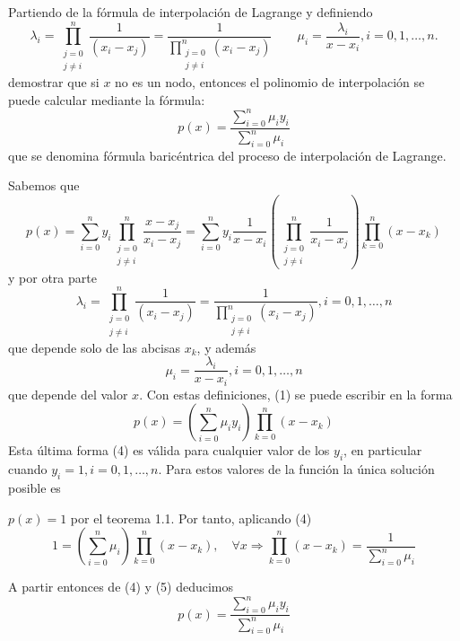 \begin{frame}
	Partiendo de la fórmula de interpolación de Lagrange y definiendo
	\begin{equation*}
		\lambda_{i}=
		\prod_{\substack{j=0 \\ j \neq i}}^{n}
		\dfrac{1}{\left(x_i-x_j\right)}=
		\dfrac{1}{\prod_{\substack{j=0 \\ j \neq i}}^{n}\left(x_i-x_j\right)}\qquad
		\mu_{i}=
		\dfrac{\lambda_{i}}{x-x_{i}}, i=0,1, \ldots, n.
	\end{equation*}
	demostrar que si $x$ no es un nodo, entonces el polinomio de
	interpolación se puede calcular mediante la fórmula:
	\begin{equation*}
		p\left(x\right)=
		\frac{\sum_{i=0}^n \mu_i y_i}{\sum_{i=0}^n \mu_i}
	\end{equation*}
	que se denomina fórmula baricéntrica del proceso de interpolación de Lagrange.
\end{frame}

\begin{frame}
	Sabemos que
	$$
		p(x)=\sum_{i=0}^n y_i \prod_{\substack{j=0 \\ j \neq i}}^n \frac{x-x_j}{x_i-x_j}=\sum_{i=0}^n y_i \frac{1}{x-x_i}\left(\prod_{\substack{j=0 \\ j \neq i}}^n \frac{1}{x_i-x_j}\right) \prod_{k=0}^n\left(x-x_k\right)
	$$
	y por otra parte
	$$
		\lambda_i=\prod_{\substack{j=0 \\ j \neq i}}^n \frac{1}{\left(x_i-x_j\right)}=\frac{1}{\prod_{\substack{j=0 \\ j \neq i}}^n\left(x_i-x_j\right)}, i=0,1, \ldots, n
	$$
	que depende solo de las abcisas $x_k$, y además
	$$
		\mu_i=\frac{\lambda_i}{x-x_i}, i=0,1, \ldots, n
	$$
	que depende del valor $x$. Con estas definiciones, (1) se puede escribir en la forma
	$$
		p(x)=\left(\sum_{i=0}^n \mu_i y_i\right) \prod_{k=0}^n\left(x-x_k\right)
	$$
	Esta última forma (4) es válida para cualquier valor de los $y_i$, en particular cuando $y_{i}=1, i=0,1, \ldots, n$. Para estos valores de la función la única solución posible es

	$p(x)=1$ por el teorema 1.1. Por tanto, aplicando (4)
	$$
		1=\left(\sum_{i=0}^n \mu_i\right) \prod_{k=0}^n\left(x-x_k\right), \quad \forall x \Longrightarrow \prod_{k=0}^n\left(x-x_k\right)=\frac{1}{\sum_{i=0}^n \mu_i}
	$$
\end{frame}

\begin{frame}
	A partir entonces de (4) y (5) deducimos
	$$
		p(x)=\frac{\sum_{i=0}^n \mu_i y_i}{\sum_{i=0}^n \mu_i}
	$$
\end{frame}